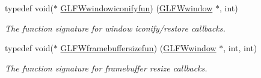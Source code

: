 \begin{DoxyCompactItemize}
typedef void($\ast$ \hyperlink{group__window_gad2d4e4c3d28b1242e742e8268b9528af}{G\+L\+F\+Wwindowiconifyfun}) (\hyperlink{group__window_ga3c96d80d363e67d13a41b5d1821f3242}{G\+L\+F\+Wwindow} $\ast$, int)
\begin{DoxyCompactList}\small\item\em The function signature for window iconify/restore callbacks. \end{DoxyCompactList}\item 
typedef void($\ast$ \hyperlink{group__window_ga3e218ef9ff826129c55a7d5f6971a285}{G\+L\+F\+Wframebuffersizefun}) (\hyperlink{group__window_ga3c96d80d363e67d13a41b5d1821f3242}{G\+L\+F\+Wwindow} $\ast$, int, int)
\begin{DoxyCompactList}\small\item\em The function signature for framebuffer resize callbacks. \end{DoxyCompactList}\end{DoxyCompactItemize}
